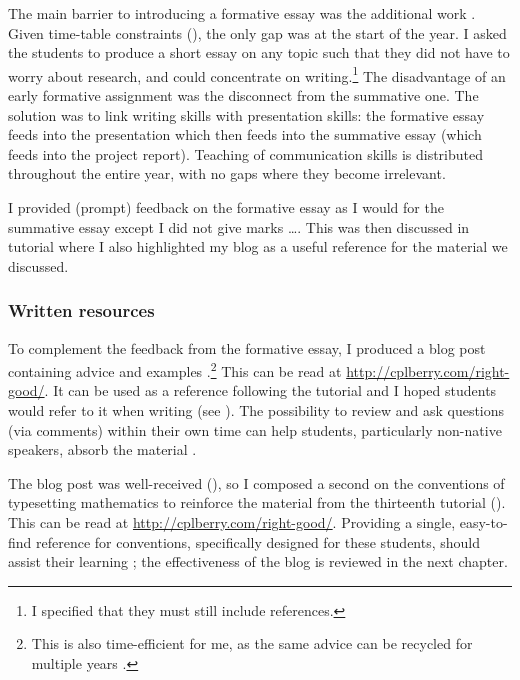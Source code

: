 The main barrier to introducing a formative essay was the additional work \citep[chapter 4]{Irons2008}. Given time-table constraints (), the only gap was at the start of the year. I asked the students to produce a short essay on any topic such that they did not have to worry about research, and could concentrate on writing.\footnote{I specified that they must still include references.} The disadvantage of an early formative assignment was the disconnect from the summative one. The solution was to link writing skills with presentation skills: the formative essay feeds into the presentation which then feeds into the summative essay (which feeds into the project report). Teaching of communication skills is distributed throughout the entire year, with no gaps where they become irrelevant.

I provided (prompt) feedback on the formative essay as I would for the summative essay except I did not give marks \ldots. This was then discussed in tutorial where I also highlighted my blog as a useful reference for the material we discussed.

\subsubsection{Written resources}\label{sec:blog}

To complement the feedback from the formative essay, I produced a blog post containing advice and examples \citep[chapter 4]{Irons2008}.\footnote{This is also time-efficient for me, as the same advice can be recycled for multiple years \citep[chapter 4]{Irons2008}.} This can be read at \url{http://cplberry.com/right-good/}. It can be used as a reference following the tutorial and I hoped students would refer to it when writing (see ). The possibility to review and ask questions (via comments) within their own time can help students, particularly non-native speakers, absorb the material \citep{Rainsbury2003}.

The blog post was well-received (), so I composed a second on the conventions of typesetting mathematics to reinforce the material from the thirteenth tutorial (). This can be read at \url{http://cplberry.com/right-good/}. Providing a single, easy-to-find reference for conventions, specifically designed for these students, should assist their learning \citep[cf.][chapter 9]{Ramsden1992}; the effectiveness of the blog is reviewed in the next chapter.

